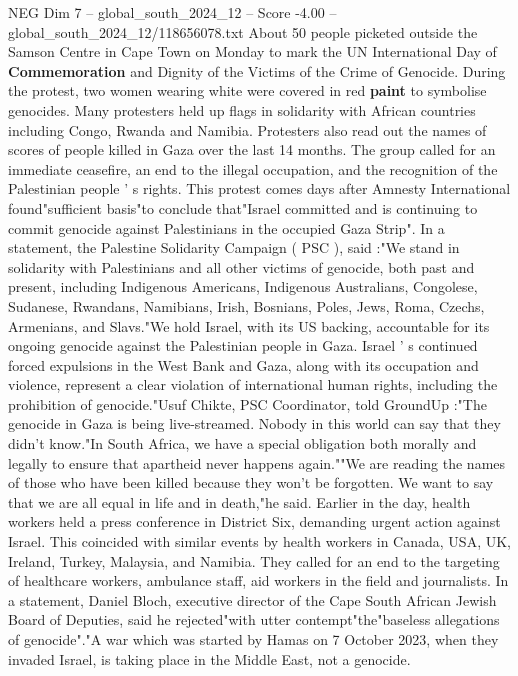 \begin{textsample}{NEG Dim 7 – global\_south\_2024\_12 – Score -4.00 – global\_south\_2024\_12/118656078.txt}  \label{ex:f7_neg_300}
About 50 people picketed outside the Samson Centre in Cape Town on Monday to mark the UN International Day of \textbf{Commemoration} and Dignity of the Victims of the Crime of Genocide.
During the protest, two women wearing white were covered in red \textbf{paint} to symbolise genocides.
Many protesters held up flags in solidarity with African countries including Congo, Rwanda and Namibia.
Protesters also read out the names of scores of people killed in Gaza over the last 14 months.
The group called for an immediate ceasefire, an end to the illegal occupation, and the recognition of the Palestinian people ' s rights.
This protest comes days after Amnesty International found"sufficient basis"to conclude that"Israel committed and is continuing to commit genocide against Palestinians in the occupied Gaza Strip".
In a statement, the Palestine Solidarity Campaign ( PSC ), said :"We stand in solidarity with Palestinians and all other victims of genocide, both past and present, including Indigenous Americans, Indigenous Australians, Congolese, Sudanese, Rwandans, Namibians, Irish, Bosnians, Poles, Jews, Roma, Czechs, Armenians, and Slavs."We hold Israel, with its US backing, accountable for its ongoing genocide against the Palestinian people in Gaza.
Israel ' s continued forced expulsions in the West Bank and Gaza, along with its occupation and violence, represent a clear violation of international human rights, including the prohibition of genocide."Usuf Chikte, PSC Coordinator, told GroundUp :"The genocide in Gaza is being live-streamed.
Nobody in this world can say that they didn't know."In South Africa, we have a special obligation both morally and legally to ensure that apartheid never happens again.""We are reading the names of those who have been killed because they won't be forgotten.
We want to say that we are all equal in life and in death,"he said.
Earlier in the day, health workers held a press conference in District Six, demanding urgent action against Israel.
This coincided with similar events by health workers in Canada, USA, UK, Ireland, Turkey, Malaysia, and Namibia.
They called for an end to the targeting of healthcare workers, ambulance staff, aid workers in the field and journalists.
In a statement, Daniel Bloch, executive director of the Cape South African Jewish Board of Deputies, said he rejected"with utter contempt"the"baseless allegations of genocide"."A war which was started by Hamas on 7 October 2023, when they invaded Israel, is taking place in the Middle East, not a genocide.

\end{textsample}
